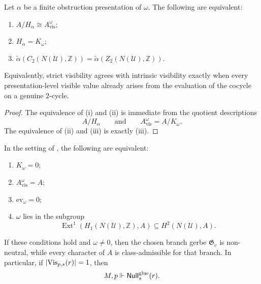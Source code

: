 \begin{corollary}\label{cor:strict-intrinsic-coincidence-criterion}
Let $\alpha$ be a finite obstruction presentation of $\omega$. The following are equivalent:
\begin{enumerate}[label=(\roman*),nosep]
\item $A/H_\alpha\cong A_{\mathrm{vis}}^{\omega}$;
\item $H_\alpha=K_{\omega}$;
\item $\widetilde\alpha(C_2(N(\mathcal U),\mathbb Z))=\widetilde\alpha(Z_2(N(\mathcal U),\mathbb Z))$.
\end{enumerate}
Equivalently, strict visibility agrees with intrinsic visibility exactly when every presentation-level visible value already arises from the evaluation of the cocycle on a genuine $2$-cycle.
\end{corollary}

\begin{proof}
The equivalence of \textup{(i)} and \textup{(ii)} is immediate from the quotient descriptions
\[
A/H_\alpha
\qquad\text{and}\qquad
A_{\mathrm{vis}}^{\omega}=A/K_{\omega}.
\]
The equivalence of \textup{(ii)} and \textup{(iii)} is exactly (iii).
\end{proof}

\begin{theorem}\label{thm:character-blind-obstructions}
In the setting of , the following are equivalent:
\begin{enumerate}[label=(\roman*),nosep]
\item $K_{\omega}=0$;
\item $A_{\mathrm{vis}}^{\omega}=A$;
\item $\mathrm{ev}_{\omega}=0$;
\item $\omega$ lies in the subgroup
\[
\operatorname{Ext}^1(H_1(N(\mathcal U),\mathbb Z),A)\subseteq H^2(N(\mathcal U),A).
\]
\end{enumerate}
If these conditions hold and $\omega\neq 0$, then the chosen branch gerbe $\mathfrak G_v$ is non-neutral, while every character of $A$ is class-admissible for that branch. In particular, if $|\mathrm{Vis}_{p,s}(r)|=1$, then
\[
M,p\Vdash \mathsf{Null}^{\mathrm{glue}}_s(r).
\]
\end{theorem}


